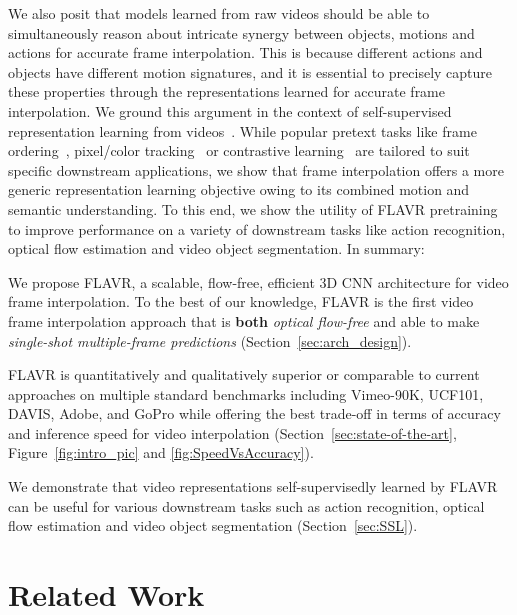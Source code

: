 \documentclass[10pt,twocolumn,letterpaper]{article}
\newcommand{\figref}[1]{Figure~\ref{#1}}
\newcommand{\secref}[1]{Section~\ref{#1}}
\newenvironment{tight_itemize}{
\begin{itemize}[leftmargin=10pt]
  \setlength{\topsep}{0pt}
  \setlength{\itemsep}{2pt}
  \setlength{\parskip}{0pt}
  \setlength{\parsep}{0pt}
}{\end{itemize}}
\newcommand{\red}[1]{{#1}}
\newcommand{\Ours}{FLAVR}
\begin{document}
We also posit that models learned from raw videos should be able to simultaneously reason about intricate synergy between objects, motions and actions for accurate frame interpolation. This is because different actions and objects have different motion signatures, and it is essential to precisely capture these properties through the representations learned for accurate frame interpolation. We ground this argument in the context of self-supervised representation learning from videos~\cite{doersch2015unsupervised, pathak2017learning, wang2015unsupervised, he2020momentum}. While popular pretext tasks like frame ordering~\cite{xu2019self, lee2017unsupervised, fernando2017self, misra2016shuffle, wei2018learning}, pixel/color tracking~\cite{vondrick2018tracking, wang2019learning} or contrastive learning~\cite{han2019video, han2020memory, gordon2020watching} are tailored to suit specific downstream applications, we show that frame interpolation offers a more generic representation learning objective owing to its combined motion and semantic understanding. To this end, we show the utility of FLAVR pretraining to improve performance on a variety of downstream tasks like action recognition, optical flow estimation and video object segmentation. 
In summary:
\begin{tight_itemize}
    \item We propose \Ours{}, a scalable, flow-free, efficient 3D CNN architecture for video frame interpolation. To the best of our knowledge, \Ours{} is the first video frame interpolation approach that is {\bf both} \emph{optical flow-free} and able to make \emph{single-shot multiple-frame predictions} (\secref{sec:arch_design}).
    \item \Ours{} is quantitatively and qualitatively superior or comparable to current approaches on multiple standard benchmarks including Vimeo-90K, UCF101, DAVIS, Adobe, and GoPro \red{ while offering the best trade-off in terms of accuracy and inference speed for video interpolation} (\secref{sec:state-of-the-art}, \figref{fig:intro_pic} and \ref{fig:SpeedVsAccuracy}).
    \item We demonstrate that video representations self-supervisedly learned by \Ours{} can be useful for various downstream tasks such as action recognition, optical flow estimation and video object segmentation (\secref{sec:SSL}).
\end{tight_itemize}

\section{Related Work}
\end{document}

